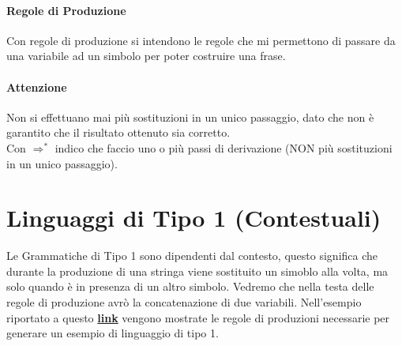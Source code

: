 \paragraph*{Regole di Produzione} Con regole di produzione si intendono le regole che mi permettono di passare
da una variabile ad un simbolo per poter costruire una frase.
\paragraph*{Attenzione} Non si effettuano mai più sostituzioni in un unico passaggio,
dato che non è garantito che il risultato ottenuto sia corretto.
\\ Con $\Rightarrow^*$ indico che faccio uno o più passi di derivazione (NON più sostituzioni in un unico
passaggio).

\section{Linguaggi di Tipo 1 (Contestuali)}
Le Grammatiche di Tipo 1 sono dipendenti dal contesto, questo significa che durante
la produzione di una stringa viene sostituito un simoblo alla volta, ma solo quando
è in presenza di un altro simbolo. Vedremo che nella testa delle regole di produzione
avrò la concatenazione di due variabili.
Nell'esempio riportato a questo 
{\href{https://elearning.unimib.it/pluginfile.php/1366772/mod_resource/content/3/grammatiche-tipo-1.pdf}{\textbf{link}}}
vengono mostrate le regole di produzioni necessarie per generare un esempio di linguaggio
di tipo 1. 

